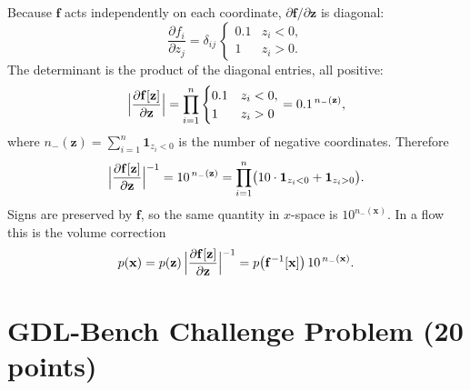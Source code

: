 \documentclass[11pt]{article}
\newcommand{\ind}{\mathbf{1}}
\begin{document}
Because \(\mathbf{f}\) acts independently on each coordinate,
\(\partial\mathbf{f}/\partial\mathbf{z}\) is diagonal:
\[
  \frac{\partial f_i}{\partial z_j}
  =\delta_{ij}\,
  \begin{cases}
    0.1 & z_i<0,\\
    1   & z_i>0.
  \end{cases}
\]
The determinant is the product of the diagonal entries, all positive:
\begin{equation}
  \Bigl|\frac{\partial\mathbf{f}[\mathbf{z}]}{\partial\mathbf{z}}\Bigr|
  =\prod_{i=1}^n
  \begin{cases}
    0.1 & z_i<0,\\
    1   & z_i>0
  \end{cases}
  =0.1^{\,n_-(\mathbf{z})},
\end{equation}
where \(n_-(\mathbf{z})=\sum_{i=1}^n\ind_{z_i<0}\) is the number of
negative coordinates. Therefore
\begin{equation}
  \Bigl|\frac{\partial\mathbf{f}[\mathbf{z}]}{\partial\mathbf{z}}\Bigr|^{-1}
  =10^{\,n_-(\mathbf{z})}
  =\prod_{i=1}^n
  \bigl(10\cdot\ind_{z_i<0}+\ind_{z_i>0}\bigr).
\end{equation}
Signs are preserved by \(\mathbf{f}\), so the same quantity in
\(x\)-space is \(10^{n_-(\mathbf{x})}\). In a flow this is the volume
correction
\begin{equation}
  p(\mathbf{x})
  =p(\mathbf{z})\,
  \Bigl|\frac{\partial\mathbf{f}[\mathbf{z}]}{\partial\mathbf{z}}\Bigr|^{-1}
  =p\bigl(\mathbf{f}^{-1}[\mathbf{x}]\bigr)\,
  10^{\,n_-(\mathbf{x})}.
\end{equation}

\section{GDL-Bench Challenge Problem (20 points)}
\end{document}

